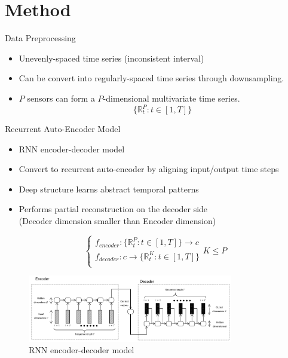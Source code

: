 \documentclass{beamer}
\begin{document}
\section{Method}

\begin{frame}{Data Preprocessing}
  \begin{itemize}
    \item Unevenly-spaced time series (inconsistent interval)
    \item Can be convert into regularly-spaced time series through downsampling.
    \item \(P\) sensors can form a \(P\)-dimensional multivariate time series.
    \[ \{ \mathbb{R}_t^P:t\in [1,T] \} \]
  \end{itemize}
\end{frame}


\begin{frame}[shrink]{Recurrent Auto-Encoder Model}
  \begin{itemize}
    \item RNN encoder-decoder model
    \item Convert to recurrent auto-encoder by aligning input/output time steps
    \item Deep structure learns abstract temporal patterns
    \item Performs partial reconstruction on the decoder side
    \\ (Decoder dimension smaller than Encoder dimension)
  \end{itemize}
  \[
    \begin{cases} 
      f_{encoder} : \{ \mathbb{R}_t^P:t \in [1, T] \} \rightarrow c \\
      f_{decoder} : c \rightarrow \{ \mathbb{R}_t^K:t \in [1, T] \} \\
    \end{cases} K \leqslant P
  \]
  \begin{figure}
    \centering
    \includegraphics[width=0.8\textwidth]{seq2seq.PNG}
    \caption{RNN encoder-decoder model}
  \end{figure}
\end{frame}
\end{document}
